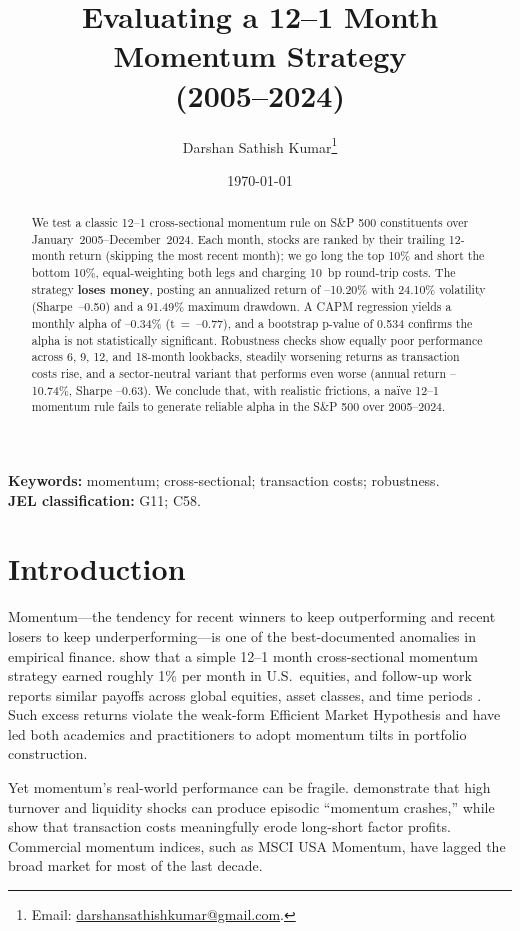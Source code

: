 \documentclass[11pt]{article}
\title{Evaluating a 12--1 Month Momentum Strategy \\ (2005--2024)}
\author{%
  Darshan Sathish Kumar\thanks{Email: \href{mailto:darshansathishkumar@gmail.com}{darshansathishkumar@gmail.com}.}%
}
\date{\today}
\begin{document}
\maketitle

\begin{abstract}
We test a classic 12--1 cross-sectional momentum rule on S\&P 500 constituents over January~2005--December~2024.  
Each month, stocks are ranked by their trailing 12-month return (skipping the most recent month); we go long the top 10\% and short the bottom 10\%, equal-weighting both legs and charging 10~bp round-trip costs.  
The strategy \textbf{loses money}, posting an annualized return of --10.20\% with 24.10\% volatility (Sharpe~--0.50) and a 91.49\% maximum drawdown.  
A CAPM regression yields a monthly alpha of --0.34\% (t~=~--0.77), and a bootstrap p-value of 0.534 confirms the alpha is not statistically significant.  
Robustness checks show equally poor performance across 6, 9, 12, and 18-month lookbacks, steadily worsening returns as transaction costs rise, and a sector-neutral variant that performs even worse (annual return --10.74\%, Sharpe --0.63).  
We conclude that, with realistic frictions, a naïve 12--1 momentum rule fails to generate reliable alpha in the S\&P 500 over 2005--2024.
\end{abstract}

\noindent\textbf{Keywords:} momentum; cross-sectional; transaction costs; robustness.\\
\textbf{JEL classification:} G11; C58.

\section{Introduction}
Momentum—the tendency for recent winners to keep outperforming and recent losers to keep underperforming—is one of the best-documented anomalies in empirical finance.  \citet{Jegadeesh1993} show that a simple 12--1 month cross-sectional momentum strategy earned roughly 1\% per month in U.S.\ equities, and follow-up work reports similar payoffs across global equities, asset classes, and time periods \citep[e.g.,][]{Asness2019}.  Such excess returns violate the weak-form Efficient Market Hypothesis and have led both academics and practitioners to adopt momentum tilts in portfolio construction.

Yet momentum’s real-world performance can be fragile.  \citet{Daniel2016} demonstrate that high turnover and liquidity shocks can produce episodic “momentum crashes,” while \citet{NovyMarx2016} show that transaction costs meaningfully erode long-short factor profits.  Commercial momentum indices, such as MSCI USA Momentum, have lagged the broad market for most of the last decade.
\end{document}
